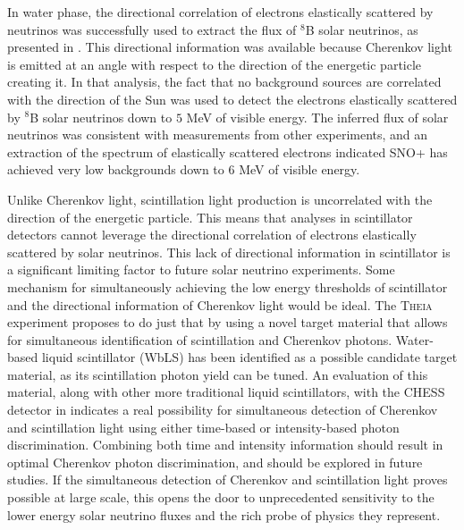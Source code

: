 In {\snop} water phase, the directional correlation of electrons elastically scattered by neutrinos was successfully used to extract the flux of $^8$B solar neutrinos, as presented in .
This directional information was available because Cherenkov light is emitted at an angle with respect to the direction of the energetic particle creating it.
In that analysis, the fact that no background sources are correlated with the direction of the Sun was used to detect the electrons elastically scattered by $^8$B solar neutrinos down to $5$ MeV of visible energy.
The inferred flux of solar neutrinos was consistent with measurements from other experiments, and an extraction of the spectrum of elastically scattered electrons indicated SNO+ has achieved very low backgrounds down to $6$ MeV of visible energy.

Unlike Cherenkov light, scintillation light production is uncorrelated with the direction of the energetic particle.
This means that analyses in scintillator detectors cannot leverage the directional correlation of electrons elastically scattered by solar neutrinos.
This lack of directional information in scintillator is a significant limiting factor to future solar neutrino experiments.
Some mechanism for simultaneously achieving the low energy thresholds of scintillator and the directional information of Cherenkov light would be ideal.
The \textsc{Theia} experiment proposes to do just that by using a novel target material that allows for simultaneous identification of scintillation and Cherenkov photons.
Water-based liquid scintillator (WbLS) has been identified as a possible candidate target material, as its scintillation photon yield can be tuned.
An evaluation of this material, along with other more traditional liquid scintillators, with the CHESS detector in  indicates a real possibility for simultaneous detection of Cherenkov and scintillation light using either time-based or intensity-based photon discrimination.
Combining both time and intensity information should result in optimal Cherenkov photon discrimination, and should be explored in future studies.
If the simultaneous detection of Cherenkov and scintillation light proves possible at large scale, this opens the door to unprecedented sensitivity to the lower energy solar neutrino fluxes and the rich probe of physics they represent.
